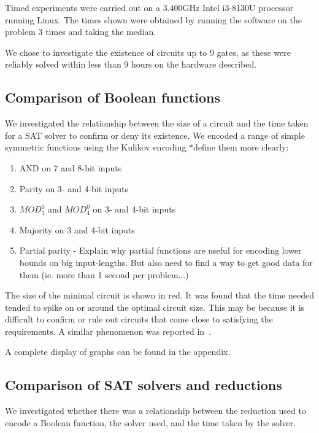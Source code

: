 \documentclass{article}
\begin{document}
Timed experiments were carried out on a 3.400GHz Intel i3-8130U processor running Linux. The times shown were obtained by running the software on the problem 3 times and taking the median.

We chose to investigate the existence of circuits up to 9 gates, as these were reliably solved within less than 9 hours on the hardware described.

\subsection{Comparison of Boolean functions}

We investigated the relationship between the size of a circuit and the time taken for a SAT solver to confirm or deny its existence. We encoded a range of simple symmetric functions using the Kulikov encoding *define them more clearly:

\begin{enumerate}
  \item AND on 7 and 8-bit inputs
  \item Parity on 3- and 4-bit inputs
  \item \(MOD^0_3\) and \(MOD^0_4\) on 3- and 4-bit inputs
  \item Majority on 3 and 4-bit inputs
  \item Partial parity - Explain why partial functions are useful for encoding lower bounds on big input-lengths. But also need to find a way to get good data for them (ie. more than 1 second per problem...)

\end{enumerate}

\begin{figure}[!ht]
\end{figure}
The size of the minimal circuit is shown in red. It was found that the time needed tended to spike on or around the optimal circuit size. This may be because it is difficult to confirm or rule out circuits that come close to satisfying the requirements. A similar phenomenon was reported in~\cite{estrada}.

A complete display of graphs can be found in the appendix.

\subsection{Comparison of SAT solvers and reductions}

We investigated whether there was a relationship between the reduction used to encode a Boolean function, the solver used, and the time taken by the solver.
\end{document}

